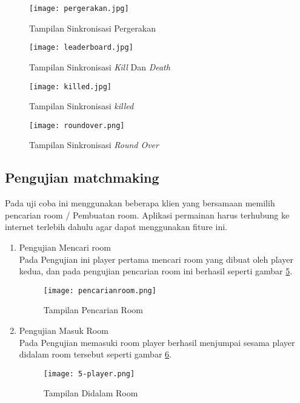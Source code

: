     \begin{figure}[h]
        \centering
        \texttt{[image: pergerakan.jpg]}
        \caption{Tampilan Sinkronisasi Pergerakan}
        \label{fig:pergerakan}
    \end{figure}
    \newpage
    \begin{figure}[h]
        \centering
        \texttt{[image: leaderboard.jpg]}
        \caption{Tampilan Sinkronisasi \textit{Kill} Dan \textit{Death}}
        \label{fig:leaderkill}
    \end{figure}
    \begin{figure}[h]
        \centering
        \texttt{[image: killed.jpg]}
        \caption{Tampilan Sinkronisasi \textit{killed}}
        \label{fig:killed}
    \end{figure}
    \newpage
    \begin{figure}[h]
        \centering
        \texttt{[image: roundover.png]}
        \caption{Tampilan Sinkronisasi \textit{Round Over}}
        \label{fig:roundover2}
    \end{figure}

    \subsection{Pengujian matchmaking}
    \noindent

    Pada uji coba ini menggunakan beberapa klien yang bersamaan memilih pencarian room / Pembuatan room. Aplikasi permainan harus terhubung ke internet terlebih dahulu agar dapat menggunakan fiture ini.
\begin{enumerate}
    \item Pengujian Mencari room \\
    Pada Pengujian ini player pertama mencari room yang dibuat oleh player kedua, dan pada pengujian pencarian room ini berhasil seperti gambar \ref{fig:pencarianroom}. 
    \begin{figure}[h]
        \centering
        \texttt{[image: pencarianroom.png]}
        \caption{Tampilan Pencarian Room}
        \label{fig:pencarianroom}
    \end{figure}
    \item Pengujian Masuk Room \\
    Pada Pengujian memasuki room player berhasil menjumpai sesama player didalam room tersebut seperti gambar \ref{fig:didalamroom}.
    \begin{figure}[h]
        \centering
        \texttt{[image: 5-player.png]}
        \caption{Tampilan Didalam Room}
        \label{fig:didalamroom}
    \end{figure}
\end{enumerate}
